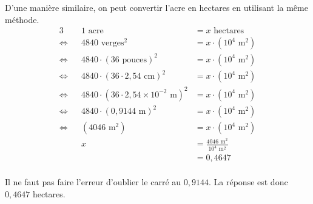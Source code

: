 \documentclass[11pt]{article}
\begin{document}
D'une manière similaire, on peut convertir l'acre en hectares en utilisant la même méthode.
\begin{alignat*}{3}
                & &                                  1\text{ acre}&=x\text{ hectares}\\
\Leftrightarrow & &                           4840\text{ verges}^2&=x\cdot(10^4\text{ m}^2)\\
\Leftrightarrow & &                  4840\cdot(36\text{ pouces})^2&=x\cdot(10^4\text{ m}^2)\\
\Leftrightarrow & &             4840\cdot(36\cdot2,54\text{ cm})^2&=x\cdot(10^4\text{ m}^2)\\
\Leftrightarrow & & 4840\cdot(36\cdot2,54\times10^{-2}\text{ m})^2&=x\cdot(10^4\text{ m}^2)\\
\Leftrightarrow & &                   4840\cdot(0,9144\text{ m})^2&=x\cdot(10^4\text{ m}^2)\\
\Leftrightarrow & &                              (4046\text{ m}^2)&=x\cdot(10^4\text{ m}^2)\\
                & &                                              x&=\frac{4046\text{ m}^2}{10^4\text{ m}^2}\\
                & &                                               &=0,4647\\
\end{alignat*}

Il ne faut pas faire l'erreur d'oublier le carré au $0,9144$. La réponse est donc $0,4647$ hectares.
\end{document}
